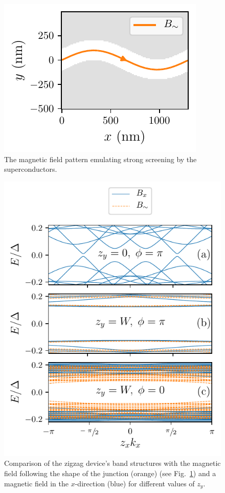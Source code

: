 \begin{figure}
\begin{center}
\includegraphics[width=0.6\columnwidth]{chapter_zigzag/figures/syst_snaking_magnetic_field.pdf}
\caption{
The magnetic field pattern emulating strong screening by the superconductors.
\label{fig:syst_snaking_magnetic_field}}
\end{center}
\end{figure}

\begin{figure}
\begin{center}
\includegraphics[width=0.6\columnwidth]{chapter_zigzag/figures/snaking_magnetic_field.pdf}
\caption{
Comparison of the zigzag device's band structures with the magnetic field following the shape of the junction (orange) (see Fig.~\ref{fig:syst_snaking_magnetic_field}) and a magnetic field in the $x$-direction (blue) for different values of $z_y$.
\label{fig:snaking_magnetic_field}}
\end{center}
\end{figure}


